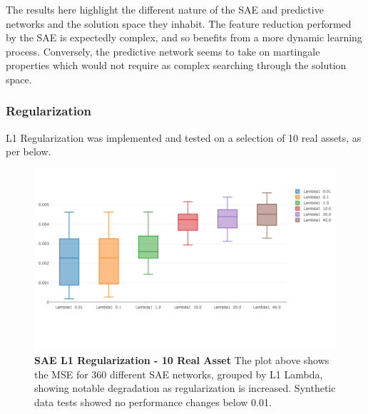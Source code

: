 \documentclass[a4paper,latin]{paper}
\begin{document}
The results here highlight the different nature of the SAE and predictive networks and the solution space they inhabit. The feature reduction performed by the SAE is expectedly complex, and so benefits from a more dynamic learning process. Conversely, the predictive network seems to take on martingale properties which would not require as complex searching through the solution space.


\subsubsection{Regularization}


L1 Regularization was implemented and tested on a selection of 10 real assets, as per below.

\begin{figure}[H]
	\centering \includegraphics[scale=0.3]{images/iteration_three/it3_l1reg_sae.png}
	\caption{\textbf{SAE L1 Regularization - 10 Real Asset} 
		\newline The plot above shows the MSE for 360 different SAE networks, grouped by L1 Lambda, showing notable degradation as regularization is increased. Synthetic data tests showed no performance changes below 0.01.}
	\label{figure-results-it3_l1reg_sae}
\end{figure}		

\end{document}
